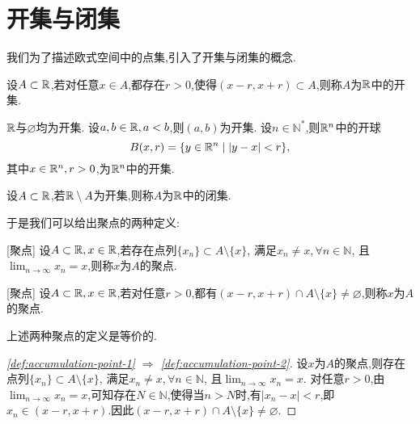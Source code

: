 \section{开集与闭集}

我们为了描述欧式空间中的点集,引入了开集与闭集的概念.

\begin{definition}
    [开集] 设$A \subset \mathbb{R}$,若对任意$x \in A$,都存在$r > 0$,使得$(x-r,x+r) \subset A$,则称$A$为$\mathbb{R}$中的开集.
\end{definition}

\begin{example}
    $\mathbb{R}$与$\varnothing$均为开集. 设$a,b \in \mathbb{R}, a < b$,则$(a,b)$为开集. 设$n \in \mathbb{N}^*$,则$\mathbb{R}^n$中的开球$$B(x,r) = \{ y \in \mathbb{R}^n \mid |y-x| < r \},$$其中$x \in \mathbb{R}^n,r > 0$,为$\mathbb{R}^n$中的开集.
\end{example}

\begin{definition}
    [闭集] 设$A \subset \mathbb{R}$,若$\mathbb{R} \setminus A$为开集,则称$A$为$\mathbb{R}$中的闭集.
\end{definition}

于是我们可以给出聚点的两种定义:
\begin{definition}\label{def:accumulation-point-1}
    [聚点] 设$A \subset \mathbb{R}, x \in \mathbb{R}$,若存在点列$\{ x_n \} \subset A \setminus \{x\}$, 满足$x_n \neq x, \forall n \in \mathbb{N}$, 且$\lim_{n \to \infty} x_n = x$,则称$x$为$A$的聚点.
\end{definition}

\begin{definition}\label{def:accumulation-point-2}
    [聚点] 设$A \subset \mathbb{R}, x \in \mathbb{R}$,若对任意$r > 0$,都有$(x-r,x+r) \cap A \setminus \{x\} \neq \varnothing$,则称$x$为$A$的聚点.
\end{definition}

\begin{proposition}
    上述两种聚点的定义是等价的.
\end{proposition}

\begin{proof}
    [\autoref{def:accumulation-point-1} $\Rightarrow$ \autoref{def:accumulation-point-2}]

    设$x$为$A$的聚点,则存在点列$\{ x_n \} \subset A \setminus \{x\}$, 满足$x_n \neq x, \forall n \in \mathbb{N}$, 且$\lim_{n \to \infty} x_n = x$. 对任意$r > 0$,由$\lim_{n \to \infty} x_n = x$,可知存在$N \in \mathbb{N}$,使得当$n > N$时,有$|x_n - x| < r$,即$x_n \in (x-r,x+r)$.因此$(x-r,x+r) \cap A \setminus \{x\} \neq \varnothing$.
\end{proof}

